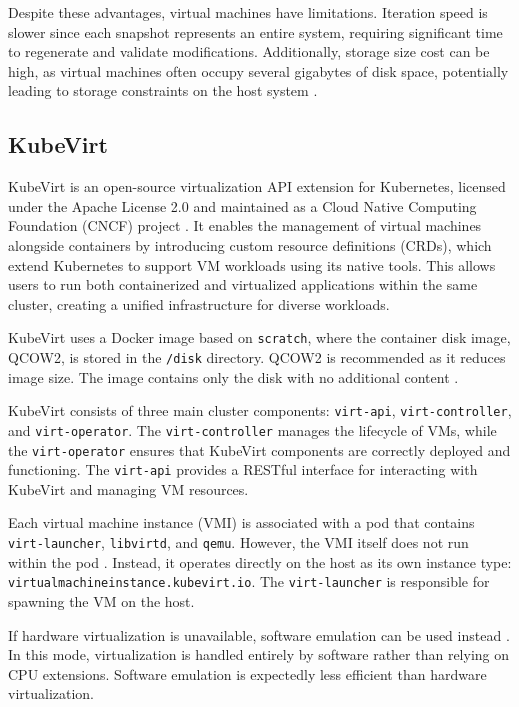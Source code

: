 Despite these advantages, virtual machines have limitations. Iteration speed is slower since each snapshot represents an entire system, requiring significant time to regenerate and validate modifications. Additionally, storage size cost can be high, as virtual machines often occupy several gigabytes of disk space, potentially leading to storage constraints on the host system \Parencite{atlassian_containers_vs_vms}.

\subsection{KubeVirt}
KubeVirt is an open-source virtualization API extension for Kubernetes, licensed under the Apache License 2.0 \Parencite{kubevirt_license} and maintained as a Cloud Native Computing Foundation (CNCF) project \parencite{kubevirt_cncf}. It enables the management of virtual machines alongside containers by introducing custom resource definitions (CRDs), which extend Kubernetes to support VM workloads using its native tools. This allows users to run both containerized and virtualized applications within the same cluster, creating a unified infrastructure for diverse workloads.

KubeVirt uses a Docker image based on \texttt{scratch}, where the container disk image, QCOW2, is stored in the \texttt{/disk} directory. QCOW2 is recommended as it reduces image size. The image contains only the disk with no additional content \Parencite{kubevirt_disks_volumes}.

KubeVirt consists of three main cluster components: \texttt{virt-api}, \texttt{virt-\allowbreak controller}, and \texttt{virt-operator}. The \texttt{virt-controller} manages the lifecycle of VMs, while the \texttt{virt-operator} ensures that KubeVirt components are correctly deployed and functioning. The \texttt{virt-api} provides a RESTful interface for interacting with KubeVirt and managing VM resources.

Each virtual machine instance (VMI) is associated with a pod that contains \texttt{virt-launcher}, \texttt{libvirtd}, and \texttt{qemu}. However, the VMI itself does not run within the pod \Parencite{kubevirt_architecture}. Instead, it operates directly on the host as its own instance type: \texttt{virtualmachineinstance.kubevirt.io}. The \texttt{virt-\allowbreak launcher} is responsible for spawning the VM on the host.

If hardware virtualization is unavailable, software emulation can be used instead \Parencite{kubevirt_installation}. In this mode, virtualization is handled entirely by software rather than relying on CPU extensions. Software emulation is expectedly less efficient than hardware virtualization.


